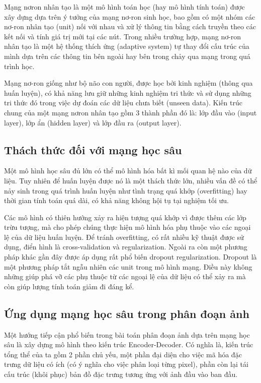 Mạng nơron nhân tạo là một mô hình toán học (hay mô hình tính toán) được xây dựng dựa trên ý tưởng của mạng nơ-ron sinh học, bao gồm có một nhóm các nơ-ron nhân tạo (unit) nối với nhau và xử lý thông tin bằng cách truyền theo các kết nối và tính giá trị mới tại các nút. Trong nhiều trường hợp, mạng nơ-ron nhân tạo là một hệ thống thích ứng (adaptive system) tự thay đổi cấu trúc của mình dựa trên các thông tin bên ngoài hay bên trong chảy qua mạng trong quá trình học. \par

Mạng nơ-ron giống như bộ não con người, được học bởi kinh nghiệm (thông qua huấn luyện), có khả năng lưu giữ những kinh nghiệm tri thức và sử dụng những tri thức đó trong việc dự đoán các dữ liệu chưa biết (unseen data). Kiến trúc chung của một mạng nơron nhân tạo gồm 3 thành phần đó là: lớp đầu vào (input layer), lớp ẩn (hidden layer) và lớp đầu ra (output layer). 

\subsection{Thách thức đối với mạng học sâu}
Một mô hình học sâu đủ lớn có thể mô hình hóa bất kì mối quan hệ nào của dữ liệu. Tuy nhiên để huấn luyện được nó là một thách thức lớn, nhiều vấn đề có thể nảy sinh trong quá trình huấn luyện như tình trạng quá khớp (overfitting) hay thời gian tính toán quá dài, có khả năng không hội tụ tại nghiệm tối ưu. \par

Các mô hình có thiên hướng xảy ra hiện tượng quá khớp vì được thêm các lớp trừu tượng, mà cho phép chúng thực hiện mô hình hóa phụ thuộc vào các ngoại lệ của dữ liệu huấn luyện. Để tránh overfitting, có rất nhiều kỹ thuật được sử dụng, điển hình là cross-validation và regularization. Ngoài ra còn một phương pháp khác gần đây được áp dụng rất phổ biến dropout regularization. Dropout là một phương pháp tắt ngẫu nhiên các unit trong mô hình mạng. Điều này không những giúp phá vỡ các phụ thuộc từ các ngoại lệ của dữ liệu có thể xảy ra mà còn giúp lượng tính toán giảm đi đáng kể.

\subsection{Ứng dụng mạng học sâu trong phân đoạn ảnh}
Một hướng tiếp cận phổ biến trong bài toán phân đoạn ảnh dựa trên mạng học sâu là xây dựng mô hình theo kiến trúc Encoder-Decoder. Có nghĩa là, kiến trúc tổng thể của ta gồm 2 phần chủ yếu, một phần đại diện cho việc mã hóa đặc trưng dữ liệu có ích (có ý nghĩa cho việc phân loại từng pixel), phần còn lại tái cấu trúc (khôi phục) bản đồ đặc trưng tương ứng với ảnh đầu vào ban đầu. \par


